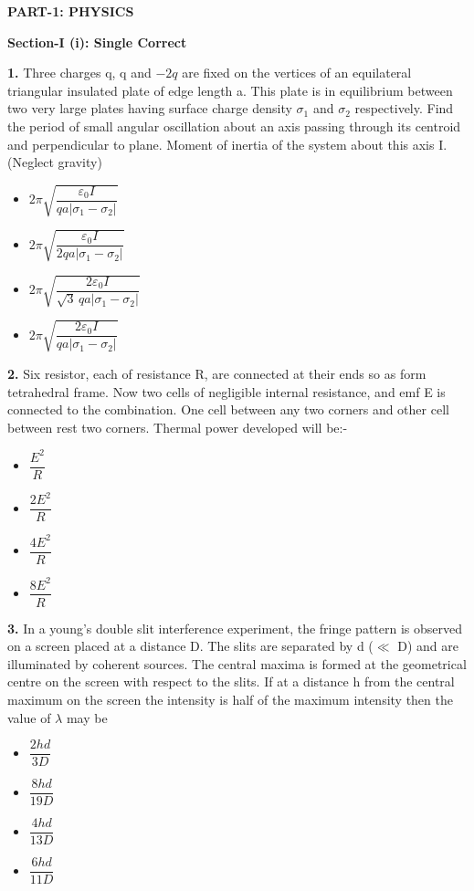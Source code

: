 \documentclass[10pt,twocolumn]{extarticle}
\newenvironment{qoptions}{\begin{itemize}[leftmargin=1.8em,itemsep=2pt,topsep=2pt,label={}]}{\end{itemize}}
\newcommand{\opt}[2]{\item[({#1})] {#2}}
\newcommand{\sectionhdr}[1]{\par\vspace{4pt}\noindent\textbf{\large #1}\par\vspace{2pt}}
\newcommand{\subsectionhdr}[1]{\par\vspace{3pt}\noindent\textbf{#1}\par\vspace{2pt}}
\begin{document}

\sectionhdr{PART-1: PHYSICS}
\subsectionhdr{Section-I (i): Single Correct}

\textbf{1.} Three charges q, q and $-2q$ are fixed on the vertices of an equilateral triangular insulated plate of edge length a. This plate is in equilibrium between two very large plates having surface charge density $\sigma_1$ and $\sigma_2$ respectively. Find the period of small angular oscillation about an axis passing through its centroid and perpendicular to plane. Moment of inertia of the system about this axis I. (Neglect gravity)

\begin{qoptions}
\opt{A}{$2\pi\sqrt{\dfrac{\varepsilon_0 I}{qa|\sigma_1-\sigma_2|}}$}
\opt{B}{$2\pi\sqrt{\dfrac{\varepsilon_0 I}{2qa|\sigma_1-\sigma_2|}}$}
\opt{C}{$2\pi\sqrt{\dfrac{2\varepsilon_0 I}{\sqrt3\,qa|\sigma_1-\sigma_2|}}$}
\opt{D}{$2\pi\sqrt{\dfrac{2\varepsilon_0 I}{qa|\sigma_1-\sigma_2|}}$}
\end{qoptions}

\textbf{2.} Six resistor, each of resistance R, are connected at their ends so as form tetrahedral frame. Now two cells of negligible internal resistance, and emf E is connected to the combination. One cell between any two corners and other cell between rest two corners. Thermal power developed will be:-

\begin{qoptions}
\opt{A}{$\dfrac{E^2}{R}$}
\opt{B}{$\dfrac{2E^2}{R}$}
\opt{C}{$\dfrac{4E^2}{R}$}
\opt{D}{$\dfrac{8E^2}{R}$}
\end{qoptions}

\textbf{3.} In a young's double slit interference experiment, the fringe pattern is observed on a screen placed at a distance D. The slits are separated by d ($\ll$ D) and are illuminated by coherent sources. The central maxima is formed at the geometrical centre on the screen with respect to the slits. If at a distance h from the central maximum on the screen the intensity is half of the maximum intensity then the value of $\lambda$ may be

\begin{qoptions}
\opt{A}{$\dfrac{2hd}{3D}$}
\opt{B}{$\dfrac{8hd}{19D}$}
\opt{C}{$\dfrac{4hd}{13D}$}
\opt{D}{$\dfrac{6hd}{11D}$}
\end{qoptions}
\end{document}
